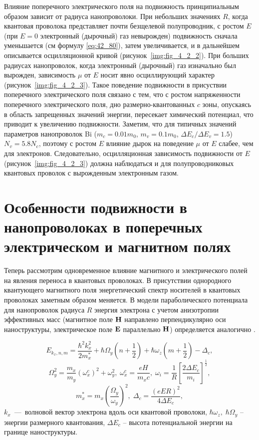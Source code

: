 Влияние поперечного электрического поля на подвижность принципиальным образом зависит от радиуса нанопроволоки. При небольших значениях $R$, когда квантовая проволока представляет почти безщелевой полупроводник, с ростом $E$ (при $E=0$ электронный (дырочный) газ невырожден) подвижность сначала уменьшается (см формулу \eqref{eq:42_80}), затем увеличивается, и в дальнейшем описывается осцилляционной кривой (рисунок~\ref{img:fig_4_2_2}). При больших радиусах нанопроволок, когда электронный (дырочный) газ изначально был вырожден, зависимость $\mu$ от $E$ носит явно осциллирующий характер (рисунок~\ref{img:fig_4_2_3}). Такое поведение подвижности в присуствии поперечного электрического поля связано с тем, что с ростом напряженности поперечного электрического поля, дно размерно-квантованных $c$ зоны, опускаясь в область запрещенных значений энергии, пересекает химический потенциал, что приводит к увеличению подвижности. Заметим, что для типичных значений параметров нанопроволок Bi ($m_c = 0.01m_0 $, $m_v = 0.1m_0$, $\Delta E_c  / \Delta E_v  = 1.5$) $N_v =5.8 N_c $, поэтому с ростом $E$ влияние дырок на поведение $\mu$ от $E$ слабее, чем для электронов. Следовательно, осцилляционная зависимость подвижности от $E$ (рисунок~\ref{img:fig_4_2_3}) должна наблюдаться и для полупроводниковых квантовых проволок с вырожденным электронным газом.

\section{Особенности подвижности в нанопроволоках в поперечных электрическом и магнитном полях} \label{sect4_3}
Теперь рассмотрим одновременное влияние магнитного и электрического полей на явления переноса в квантовых проволоках. В присутствии однородного квантующего магнитного поля энергетический спектр носителей в квантовых проволоках заметным образом меняется. В модели параболического потенциала для нанопроволок радиуса $R$ энергия электрона с учетом анизотропии эффективных масс (магнитное поле $\boldsymbol{\mathbf{H}}$  направлено перпендикулярно оси наноструктуры, электрическое поле $\boldsymbol{\mathbf{E}}$ параллельно $\boldsymbol{\mathbf{H}}$) определяется аналогично \cite{Geiler1998}.

\begin{equation} \label{eq:43_10}
	E_{k_x,n,m}=\frac{{\hbar }^2k^2_x}{2m^*_x}+\hbar {\Omega }_y\left(n+\frac{1}{2}\right)+\hbar {\omega }_z\left(m+\frac{1}{2}\right)-{\Delta }_c,   
\end{equation}
\[
\Omega^2_y=\frac{m_x}{m_y}{\left({\omega }^c_x\right)}^2+\omega^2_y,\;
\omega^c_x=\frac{eH}{m_x c},\;
\omega_i=\frac{1}{R}{\left[\frac{2 \Delta E_c}{m_i}\right]}^{\frac{1}{2}},
\]
\[
m^*_x=m_x{\left(\frac{{\Omega }_y}{{\omega }_y}\right)}^2,\;
\Delta_c=\frac{{\left(eER\right)}^2}{4\Delta E_c},
\]
$k_x$~---~волновой вектор электрона вдоль оси квантовой проволоки, $\hbar \omega_z,\; \hbar \Omega_y$ -- энергии размерного квантования, $\Delta E_c$ -- высота потенциальной энергии на границе наноструктуры.

